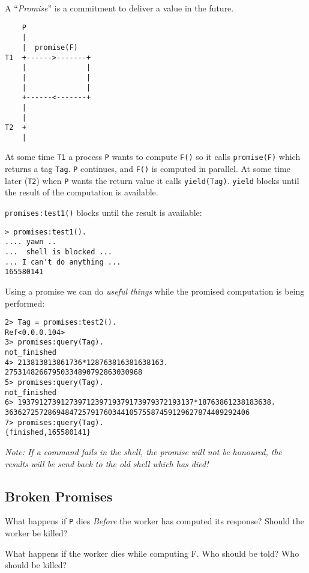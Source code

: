 \documentclass[10pt]{article}
\begin{document}
A ``{\sl Promise}'' is a commitment to deliver a value in the future.

\begin{verbatim}
    P 
    |
    |  promise(F)  
T1  +------>-------+
    |              |
    |              | 
    |              |
    +------<-------+
    |
    |
T2  +
    |
\end{verbatim}

At some time \verb+T1+ a process \verb+P+ wants to compute \verb+F()+ so it calls
\verb+promise(F)+ which returns a tag \verb+Tag+. \verb+P+ continues,
and \verb+F()+ is computed in parallel. At some time later (\verb+T2+) when 
\verb+P+ wants the return value it calls \verb+yield(Tag)+. \verb+yield+ blocks until
the result of the computation is available.


\verb+promises:test1()+ blocks until the result is available:

\begin{Verbatim}
> promises:test1().
.... yawn .. 
...  shell is blocked ...
... I can't do anything ...
165580141
\end{Verbatim}

Using a promise we can do {\sl useful things} \textregistered{} while
the promised computation is being performed:

\begin{Verbatim}
2> Tag = promises:test2().
Ref<0.0.0.104>
3> promises:query(Tag).
not_finished
4> 213813813861736*128763816381638163.
27531482667950334890792863030968
5> promises:query(Tag).               
not_finished
6> 19379127391273971239719379173979372193137*18763861238183638.
363627257286948472579176034410575587459129627874409292406
7> promises:query(Tag).                                        
{finished,165580141}
\end{Verbatim}

{\sl Note: If a command fails in the shell, the promise will not
be honoured, the results will be send back to the old shell which has died!}

\subsection{Broken Promises}

What happens if \verb+P+ dies {\sl Before} the worker has computed
its response? Should the worker be killed?

What happens if the worker dies while computing F. Who should be told?
Who should be killed?
\end{document}
